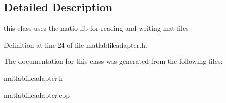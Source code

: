 \subsection{Detailed Description}
this class uses the matio-\/lib for reading and writing mat-\/files 

Definition at line 24 of file matlabfileadapter.\-h.



The documentation for this class was generated from the following files\-:\begin{DoxyCompactItemize}
\item 
matlabfileadapter.\-h\item 
matlabfileadapter.\-cpp\end{DoxyCompactItemize}
